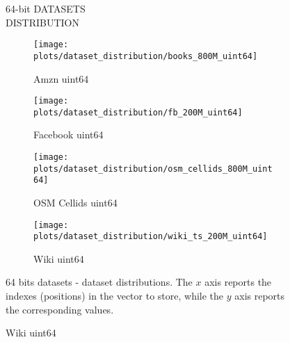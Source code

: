 \documentclass{article}
\begin{document}
\begin{figure}[!htbp]
\fbox
{
\begin{minipage}[t][0.98\textheight][t]{\textwidth}
\centering
    \vspace{20px}
    \begin{minipage}{0.95\linewidth}
    64-bit DATASETS \\ DISTRIBUTION
    \end{minipage}
    \vspace{20px}

   \begin{minipage}{0.45\linewidth}
        \begin{figure}[H]
        \texttt{[image: plots/dataset\_distribution/books\_800M\_uint64]}
        \caption{Amzn uint64}
        \end{figure}
    \end{minipage}
    \begin{minipage}{0.45\linewidth}
        \begin{figure}[H]
            \texttt{[image: plots/dataset\_distribution/fb\_200M\_uint64]}
            \caption{Facebook uint64}
        \end{figure}
    \end{minipage}

    \vfill
    
    \begin{minipage}{0.45\linewidth}
        \begin{figure}[H]
        \texttt{[image: plots/dataset\_distribution/osm\_cellids\_800M\_uint64]}
        \caption{OSM Cellids uint64}
        \end{figure}
    \end{minipage}
    \begin{minipage}{0.45\linewidth}
        \begin{figure}[H]
            \texttt{[image: plots/dataset\_distribution/wiki\_ts\_200M\_uint64]}
            \caption{Wiki uint64}
        \end{figure}
    \end{minipage}

    \vfill
    \centering
    \begin{minipage}{\linewidth}
        64 bits datasets - dataset distributions. The $x$ axis reports the indexes (positions) in the vector to store, while the $y$ axis reports the corresponding values.
    \end{minipage}
    \vspace{10px}
\end{minipage}
}
\end{figure}
\end{document}
